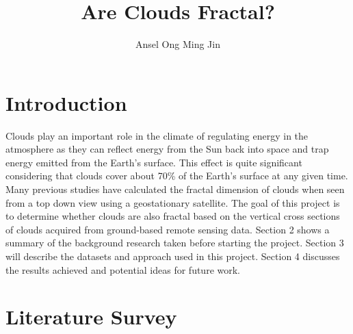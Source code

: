 \documentclass[titlepage]{article}
\title{\textbf{Are Clouds Fractal?}}
\author{Ansel Ong Ming Jin}
\date{\parbox{\linewidth}{\centering%
  July 2024 \endgraf\bigskip
  \textbf{Supervisor Team:} Dr Adam Povey, Dr Kamil Mroz\endgraf\medskip
  SURE2024 Scheme \endgraf\medskip
  University of Leicester}}
\begin{document}
\maketitle

\section{Introduction}

Clouds play an important role in the climate of regulating energy in the atmosphere as they can reflect energy from the Sun back into space and trap energy emitted from the Earth’s surface. This effect is quite significant considering that clouds cover about 70\% of the Earth’s surface at any given time. Many previous studies have calculated the fractal dimension of clouds when seen from a top down view using a geostationary satellite. The goal of this project is to determine whether clouds are also fractal based on the vertical cross sections of clouds acquired from ground-based remote sensing data. Section 2 shows a summary of the background research taken before starting the project. Section 3 will describe the datasets and approach used in this project. Section 4 discusses the results achieved and potential ideas for future work.

\section{Literature Survey}
\end{document}
